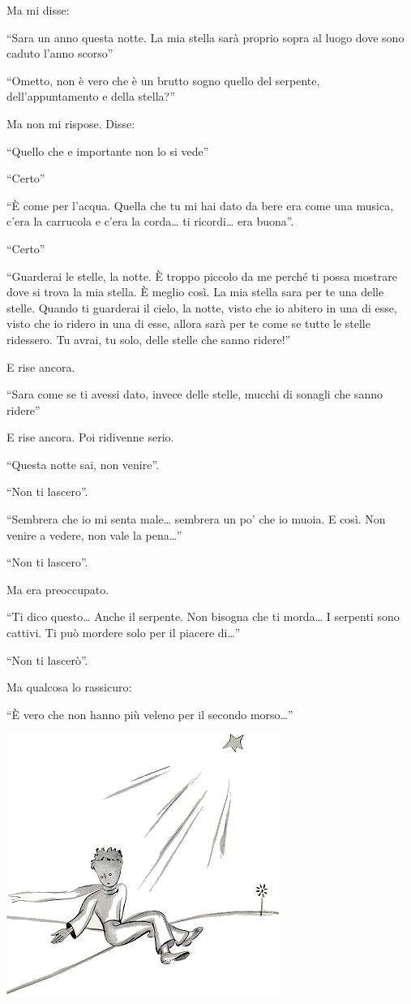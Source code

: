\documentclass[11pt]{scrbook}
\begin{document}
Ma mi disse:

``Sara un anno questa notte. La mia stella sarà proprio sopra al luogo
dove sono caduto l'anno scorso''

``Ometto, non è vero che è un brutto sogno quello del serpente,
dell'appuntamento e della stella?''

Ma non mi rispose. Disse:

``Quello che e importante non lo si vede''

``Certo''

``È come per l'acqua. Quella che tu mi hai dato da bere era come una
musica, c'era la carrucola e c'era la corda\ldots{} ti ricordi\ldots{}
era buona''.

``Certo''

``Guarderai le stelle, la notte. È troppo piccolo da me perché ti possa
mostrare dove si trova la mia stella. È meglio così. La mia stella sara
per te una delle stelle. Quando ti guarderai il cielo, la notte, visto
che io abitero in una di esse, visto che io ridero in una di esse,
allora sarà per te come se tutte le stelle ridessero. Tu avrai, tu solo,
delle stelle che sanno ridere!''

E rise ancora.

``Sara come se ti avessi dato, invece delle stelle, mucchi di sonagli
che sanno ridere''

E rise ancora. Poi ridivenne serio.

``Questa notte sai, non venire''.

``Non ti lascero''.

``Sembrera che io mi senta male\ldots{} sembrera un po' che io muoia. E
così. Non venire a vedere, non vale la pena\ldots{}''

``Non ti lascero''.

Ma era preoccupato.

``Ti dico questo\ldots{} Anche il serpente. Non bisogna che ti
morda\ldots{} I serpenti sono cattivi. Ti può mordere solo per il
piacere di\ldots{}''

``Non ti lascerò''.

Ma qualcosa lo rassicuro:

``È vero che non hanno più veleno per il secondo morso\ldots{}''

\begin{center}
\includegraphics{img/26b}
\end{center}
\end{document}
